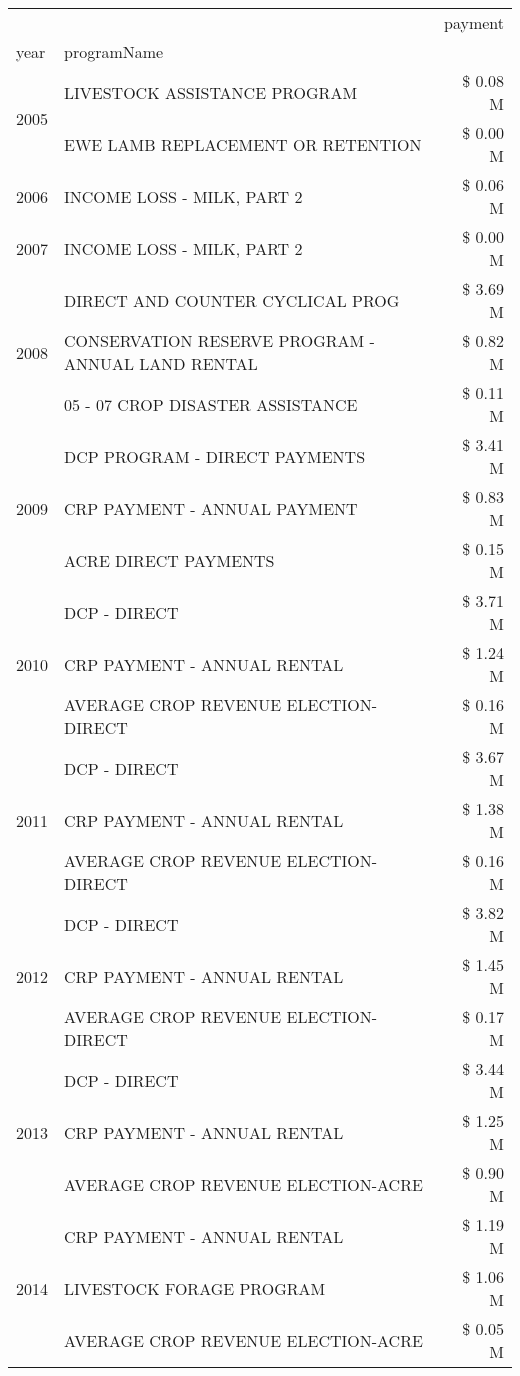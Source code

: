 \begin{tabular}{llr}
\toprule
 &  & payment \\
year & programName &  \\
\midrule
\multirow[t]{2}{*}{2005} & LIVESTOCK ASSISTANCE PROGRAM & \$ 0.08 M \\
 & EWE LAMB REPLACEMENT OR RETENTION & \$ 0.00 M \\
\cline{1-3}
2006 & INCOME LOSS - MILK, PART 2 & \$ 0.06 M \\
\cline{1-3}
2007 & INCOME LOSS - MILK, PART 2 & \$ 0.00 M \\
\cline{1-3}
\multirow[t]{3}{*}{2008} & DIRECT AND COUNTER CYCLICAL PROG & \$ 3.69 M \\
 & CONSERVATION RESERVE PROGRAM - ANNUAL LAND RENTAL & \$ 0.82 M \\
 & 05 - 07 CROP DISASTER ASSISTANCE & \$ 0.11 M \\
\cline{1-3}
\multirow[t]{3}{*}{2009} & DCP PROGRAM - DIRECT PAYMENTS & \$ 3.41 M \\
 & CRP PAYMENT - ANNUAL PAYMENT & \$ 0.83 M \\
 & ACRE DIRECT PAYMENTS & \$ 0.15 M \\
\cline{1-3}
\multirow[t]{3}{*}{2010} & DCP - DIRECT & \$ 3.71 M \\
 & CRP PAYMENT - ANNUAL RENTAL & \$ 1.24 M \\
 & AVERAGE CROP REVENUE ELECTION-DIRECT & \$ 0.16 M \\
\cline{1-3}
\multirow[t]{3}{*}{2011} & DCP - DIRECT & \$ 3.67 M \\
 & CRP PAYMENT - ANNUAL RENTAL & \$ 1.38 M \\
 & AVERAGE CROP REVENUE ELECTION-DIRECT & \$ 0.16 M \\
\cline{1-3}
\multirow[t]{3}{*}{2012} & DCP - DIRECT & \$ 3.82 M \\
 & CRP PAYMENT - ANNUAL RENTAL & \$ 1.45 M \\
 & AVERAGE CROP REVENUE ELECTION-DIRECT & \$ 0.17 M \\
\cline{1-3}
\multirow[t]{3}{*}{2013} & DCP - DIRECT & \$ 3.44 M \\
 & CRP PAYMENT - ANNUAL RENTAL & \$ 1.25 M \\
 & AVERAGE CROP REVENUE ELECTION-ACRE & \$ 0.90 M \\
\cline{1-3}
\multirow[t]{3}{*}{2014} & CRP PAYMENT - ANNUAL RENTAL & \$ 1.19 M \\
 & LIVESTOCK FORAGE PROGRAM & \$ 1.06 M \\
 & AVERAGE CROP REVENUE ELECTION-ACRE & \$ 0.05 M \\

\end{tabular}
